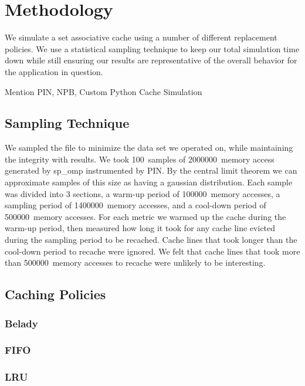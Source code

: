 \newcommand{\SAMPN}{100}
\newcommand{\SAMPK}{2000000}
\newcommand{\SAMP}{1400000}
\newcommand{\WARM}{100000}
\newcommand{\COOL}{500000}
\newcommand{\comment}[1]{}

\section{Methodology}
We simulate a set associative cache using a number of different
replacement policies.
We use a statistical sampling technique to keep our total simulation
time down while still ensuring our results are representative of the
overall behavior for the application in question.

Mention PIN, NPB, Custom Python Cache Simulation

\subsection{Sampling Technique}
We sampled the file to minimize the data set we operated on, while maintaining the integrity with results.
	We took \SAMPN~samples of \SAMPK~memory access generated by sp\_omp instrumented by PIN.
	By the central limit theorem we can approximate samples of this size as having a gaussian distribution.
	Each sample was divided into 3 sections, a warm-up period of \WARM~memory accesses,
		a sampling period of \SAMP~memory accesses, and a cool-down period of \COOL~memory accesses.
	For each metric we warmed up the cache during the warm-up period,
		then measured how long it took for any cache line evicted during the sampling period to be recached.
	Cache lines that took longer than the cool-down period to recache were ignored.
	We felt that cache lines that took more than \COOL~memory accesses to recache were unlikely to be interesting.

\subsection{Caching Policies}
\label{sec:policies}

\subsubsection{Belady}
\subsubsection{FIFO}
\subsubsection{LRU}
